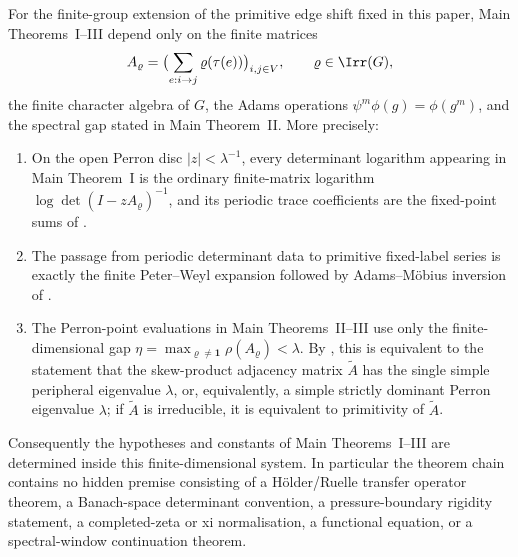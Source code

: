 \begin{proposition}
  \label{prop:intro-finite-state-transfer-split}
  For the finite-group extension of the primitive edge shift fixed in this
  paper, Main Theorems~I--III depend only on the finite matrices
  \[
    A_\varrho=\bigl(\sum_{e:i\to j}\varrho(\tau(e))\bigr)_{i,j\in V},
    \qquad \varrho\in\Irr(G),
  \]
  the finite character algebra of \(G\), the Adams operations
  \(\psi^m\phi(g)=\phi(g^m)\), and the spectral gap stated in Main
  Theorem~II.  More precisely:
  \begin{enumerate}[label=\rm(\alph*)]
  \item On the open Perron disc \(|z|<\lambda^{-1}\), every determinant
    logarithm appearing in Main Theorem~I is the ordinary finite-matrix
    logarithm \(\log\det(I-zA_\varrho)^{-1}\), and its periodic trace
    coefficients are the fixed-point sums of
    .
  \item The passage from periodic determinant data to primitive
    fixed-label series is exactly the finite Peter--Weyl expansion followed
    by Adams--M\"obius inversion of
    .
  \item The Perron-point evaluations in Main Theorems~II--III use only the
    finite-dimensional gap
    \(\eta=\max_{\varrho\ne\mathbf1}\rho(A_\varrho)<\lambda\). By
    , this is equivalent to
    the statement that the skew-product adjacency matrix \(\widetilde A\)
    has the single simple peripheral eigenvalue \(\lambda\), or,
    equivalently, a simple strictly dominant Perron eigenvalue
    \(\lambda\); if \(\widetilde A\) is irreducible, it is equivalent to
    primitivity of \(\widetilde A\).
  \end{enumerate}
  Consequently the hypotheses and constants of Main Theorems~I--III are
  determined inside this finite-dimensional system.  In particular the theorem
  chain contains no hidden premise consisting of a H\"older/Ruelle transfer
  operator theorem, a Banach-space determinant convention, a pressure-boundary
  rigidity statement, a completed-zeta or xi normalisation, a functional
  equation, or a spectral-window continuation theorem.
\end{proposition}
